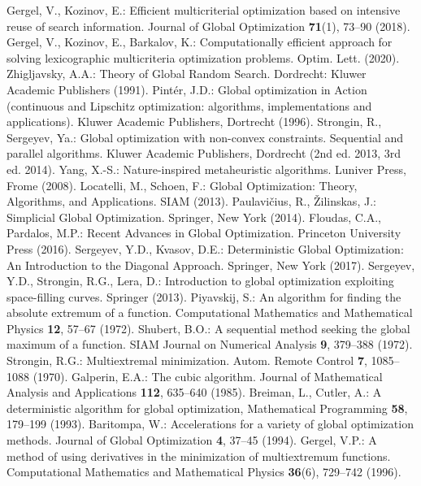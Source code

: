 \documentclass[runningheads]{llncs}
\begin{document}
\begin{thebibliography}{1}
 Gergel, V., Kozinov, E.: Efficient multicriterial optimization based on intensive reuse of search information. Journal of Global Optimization \textbf{71}(1), 73--90 (2018).
 Gergel, V., Kozinov, E., Barkalov, K.: Computationally efficient approach for solving lexicographic multicriteria optimization problems. Optim. Lett. (2020). 
 Zhigljavsky, A.A.: Theory of Global Random Search. Dordrecht: Kluwer Academic Publishers (1991).
 Pint{\' e}r, J.D.: Global optimization in Action (continuous and Lipschitz optimization: algorithms, implementations and applications). Kluwer Academic Publishers, Dortrecht (1996).
 Strongin, R., Sergeyev, Ya.: Global optimization with non-convex constraints. Sequential and parallel algorithms. Kluwer Academic Publishers, Dordrecht (2nd ed. 2013, 3rd ed. 2014).
 Yang, X.-S.: Nature-inspired metaheuristic algorithms. Luniver Press, Frome (2008).
 Locatelli, M., Schoen, F.: Global Optimization: Theory, Algorithms, and Applications. SIAM (2013).
 Paulavi{\v c}ius, R., {\v Z}ilinskas, J.: Simplicial Global Optimization. Springer, New York (2014). 
 Floudas, C.A., Pardalos, M.P.: Recent Advances in Global Optimization. Princeton University Press (2016).
 Sergeyev, Y.D., Kvasov, D.E.: Deterministic Global Optimization: An Introduction to the Diagonal Approach. Springer, New York (2017). 
 Sergeyev, Y.D., Strongin, R.G., Lera, D.: Introduction to global optimization exploiting space-filling curves. Springer (2013).
 Piyavskij, S.: An algorithm for finding the absolute extremum of a function. Computational Mathematics and Mathematical Physics \textbf{12}, 57--67 (1972).
 Shubert, B.O.: A sequential method seeking the global maximum of a function. SIAM Journal on Numerical Analysis \textbf{9}, 379--388 (1972).
 Strongin, R.G.: Multiextremal minimization. Autom. Remote Control \textbf{7}, 1085--1088 (1970).
 Galperin, E.A.: The cubic algorithm. Journal of Mathematical Analysis and Applications \textbf{112}, 635--640 (1985).
 Breiman, L., Cutler, A.: A deterministic algorithm for global optimization, Mathematical Programming \textbf{58}, 179--199 (1993).
 Baritompa, W.: Accelerations for a variety of global optimization methods. Journal of Global Optimization \textbf{4}, 37--45 (1994).
 Gergel, V.P.: A method of using derivatives in the minimization of multiextremum functions. Computational Mathematics and Mathematical Physics \textbf{36}(6), 729--742 (1996).

\end{thebibliography}
\end{document}
